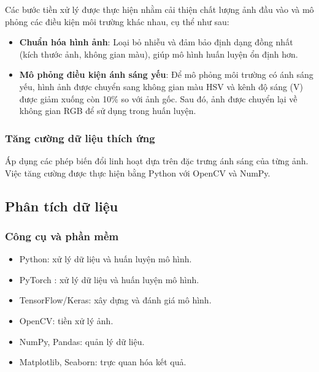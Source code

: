 Các bước tiền xử lý được thực hiện nhằm cải thiện chất lượng ảnh đầu vào và mô phỏng các điều kiện môi trường khác nhau, cụ thể như sau:

\begin{itemize}
    \item \textbf{Chuẩn hóa hình ảnh}: Loại bỏ nhiễu và đảm bảo định dạng đồng nhất (kích thước ảnh, không gian màu), giúp mô hình huấn luyện ổn định hơn.
    
    \item \textbf{Mô phỏng điều kiện ánh sáng yếu}: Để mô phỏng môi trường có ánh sáng yếu, hình ảnh được chuyển sang không gian màu HSV và kênh độ sáng (V) được giảm xuống còn 10\% so với ảnh gốc. Sau đó, ảnh được chuyển lại về không gian RGB để sử dụng trong huấn luyện.
\end{itemize}

\subsubsection{Tăng cường dữ liệu thích ứng}
Áp dụng các phép biến đổi linh hoạt dựa trên đặc trưng ánh sáng của từng ảnh. Việc tăng cường được thực hiện bằng Python với OpenCV và NumPy.

\subsection{Phân tích dữ liệu}
\subsubsection{Công cụ và phần mềm}
\begin{itemize}
    \item Python: xử lý dữ liệu và huấn luyện mô hình.
    \item PyTorch : xử lý dữ liệu và huấn luyện mô hình.
    \item TensorFlow/Keras: xây dựng và đánh giá mô hình.
    \item OpenCV: tiền xử lý ảnh.
    \item NumPy, Pandas: quản lý dữ liệu.
    \item Matplotlib, Seaborn: trực quan hóa kết quả.
\end{itemize}

